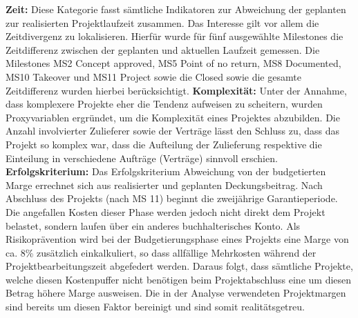 \newline\newline\textbf{Zeit:} Diese Kategorie fasst sämtliche Indikatoren zur Abweichung der geplanten zur realisierten Projektlaufzeit zusammen. Das Interesse gilt vor allem die Zeitdivergenz zu lokalisieren. Hierfür wurde für fünf ausgewählte Milestones die Zeitdifferenz zwischen der geplanten und aktuellen Laufzeit gemessen. Die Milestones MS2 Concept approved, MS5 Point of no return, MS8 Documented, MS10 Takeover und MS11 Project sowie die  Closed sowie die gesamte Zeitdifferenz wurden hierbei berücksichtigt. 	\newline\newline\textbf{Komplexität:} Unter der Annahme, dass komplexere Projekte eher die Tendenz aufweisen zu scheitern, wurden Proxyvariablen ergründet, um die Komplexität eines Projektes abzubilden. Die Anzahl involvierter Zulieferer sowie der Verträge lässt den Schluss zu, dass das Projekt so komplex war, dass die Aufteilung der Zulieferung respektive die Einteilung in verschiedene Aufträge (Verträge) sinnvoll erschien.
\newline\newline\textbf{Erfolgskriterium:} Das Erfolgskriterium Abweichung von der budgetierten Marge errechnet sich aus realisierter und geplanten Deckungsbeitrag. Nach Abschluss des Projekts (nach MS 11) beginnt die zweijährige Garantieperiode. Die angefallen Kosten dieser Phase werden jedoch nicht direkt dem Projekt belastet, sondern laufen über ein anderes buchhalterisches Konto. Als Risikoprävention wird bei der Budgetierungsphase eines Projekts eine Marge von ca. 8\% zusätzlich einkalkuliert, so dass allfällige Mehrkosten während der Projektbearbeitungszeit abgefedert werden. Daraus folgt, dass sämtliche Projekte, welche diesen Kostenpuffer nicht benötigen beim Projektabschluss eine um diesen Betrag höhere Marge ausweisen. Die in der Analyse verwendeten Projektmargen sind bereits um diesen Faktor bereinigt und sind somit realitätsgetreu.


